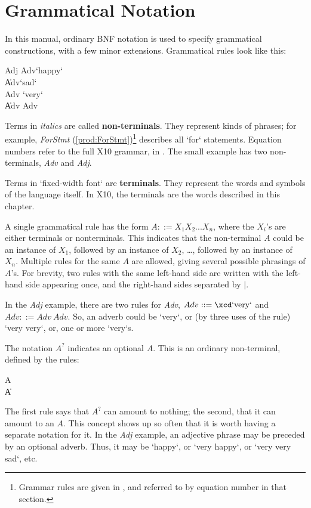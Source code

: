 \section{Grammatical Notation}

In this manual, ordinary BNF notation is used to specify grammatical
constructions, with a few minor extensions. 
Grammatical rules look like this: \\
\begin{bbgrammar}
Adj \: Adv\opt \mbox{\xcd`happy`}\\
    \| Adv\opt \mbox{\xcd`sad`}\\ 
Adv \: \mbox{\xcd`very`}\\
    \| Adv Adv 
\end{bbgrammar}

Terms in {\em italics} are called {\bf non-terminals}.  They 
represent kinds of phrases; for example, {\em ForStmt}
(\ref{prod:ForStmt})\footnote{Grammar rules are given in ,
and referred to by equation number in that section.} describes all \xcd`for` statements.  
Equation numbers refer to the full X10 grammar, in .  
The small example has two non-terminals, {\em Adv} and {\em Adj}.  

Terms in \xcd`fixed-width font` are {\bf terminals}.  They represent the words
and symbols of the language itself.  In X10, the terminals are the words
described in this chapter.

A single grammatical rule has the form {$ A \mathrel{::=} X_1 X_2 ... X_n $},
where the $X_i$'s are either terminals or nonterminals.  This indicates that
the non-terminal $A$ could be an instance of $X_1$, followed by an instance of
$X_2$, \ldots, followed by an instance of $X_n$.  Multiple rules for the same
$A$ are allowed, giving several possible phrasings of $A$'s.  For brevity,
two rules with the same left-hand side are written with the left-hand side
appearing once, and the right-hand sides 
separated by $|$.  

In the {\em Adj} example, there are two rules for {\it Adv}, 
$Adv \mathrel{::=} \mbox{\xcd`very`}$ and
$Adv \mathrel{::=} Adv~Adv$.  So, an adverb could be \xcd`very`, or (by three
uses of the rule) \xcd`very very`, or, one or more \xcd`very`s.  

The notation $A^{?}$ indicates an optional $A$.  This is an ordinary
non-terminal, defined by the rules:\\ 
\begin{bbgrammar}
A\opt \:  \\
    \| A
\end{bbgrammar}
The first rule says that $A^?$ can amount to nothing; the second, that it can
amount to an $A$.  This concept shows up so often that it is worth having a
separate notation for it.  In the {\em Adj} example, an adjective phrase may be
preceded by an optional adverb. Thus, it may be \xcd`happy`, or 
\xcd`very happy`, or \xcd`very very sad`, etc. 
